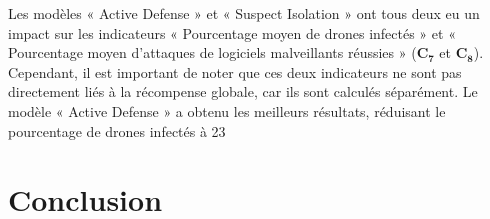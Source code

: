 Les modèles « Active Defense » et « Suspect Isolation » ont tous deux eu un impact sur les indicateurs « Pourcentage moyen de drones infectés » et « Pourcentage moyen d'attaques de logiciels malveillants réussies » ($\mathbf{C_7}$ et $\mathbf{C_8}$). Cependant, il est important de noter que ces deux indicateurs ne sont pas directement liés à la récompense globale, car ils sont calculés séparément. Le modèle « Active Defense » a obtenu les meilleurs résultats, réduisant le pourcentage de drones infectés à 23 %



\section{Conclusion}\label{sec:conclusion}

